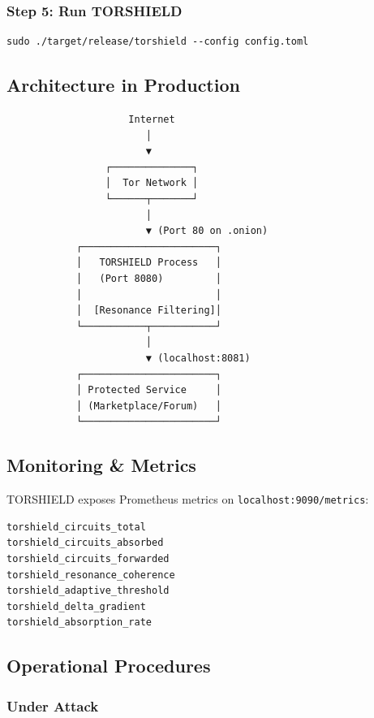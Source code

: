 \documentclass[11pt,a4paper]{article}
\begin{document}
\subsubsection{Step 5: Run TORSHIELD}

\begin{verbatim}
sudo ./target/release/torshield --config config.toml
\end{verbatim}

\subsection{Architecture in Production}

\begin{verbatim}
                     Internet
                        │
                        ▼
                 ┌──────────────┐
                 │  Tor Network │
                 └──────┬───────┘
                        │
                        ▼ (Port 80 on .onion)
            ┌───────────────────────┐
            │   TORSHIELD Process   │
            │   (Port 8080)         │
            │                       │
            │  [Resonance Filtering]│
            └───────────┬───────────┘
                        │
                        ▼ (localhost:8081)
            ┌───────────────────────┐
            │ Protected Service     │
            │ (Marketplace/Forum)   │
            └───────────────────────┘
\end{verbatim}

\subsection{Monitoring \& Metrics}

TORSHIELD exposes Prometheus metrics on \texttt{localhost:9090/metrics}:

\begin{verbatim}
torshield_circuits_total
torshield_circuits_absorbed
torshield_circuits_forwarded
torshield_resonance_coherence
torshield_adaptive_threshold
torshield_delta_gradient
torshield_absorption_rate
\end{verbatim}

\subsection{Operational Procedures}

\subsubsection{Under Attack}
\end{document}
